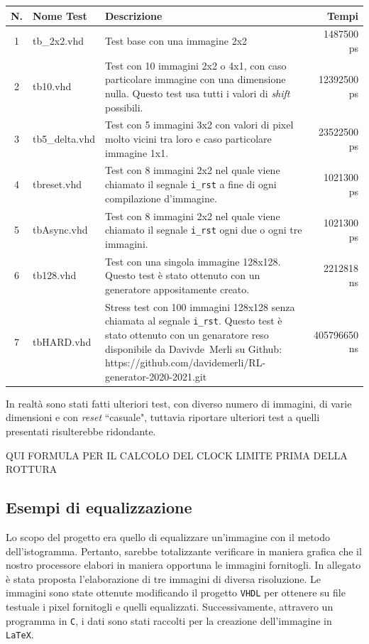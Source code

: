 \documentclass[11pt, a4paper]{article}
\begin{document}
\begin{center}
  \begin{tabular}{|c|l|p{10cm}|r|}
    \hline
    N. &Nome Test & Descrizione & Tempi\\
    \hline
    1 & tb\_2x2.vhd & Test base con una immagine 2x2 & 1487500 ps \\
    \hline
    2 & tb10.vhd & Test con 10 immagini 2x2 o 4x1, con caso particolare immagine con una dimensione nulla. Questo test usa tutti i valori di \textit{shift} possibili.&12392500 ps\\
    \hline
    3 & tb5\_delta.vhd & Test con 5 immagini 3x2 con valori di pixel molto vicini tra loro e caso particolare immagine 1x1. & 23522500 ps\\
    \hline
    4 & tbreset.vhd & Test con 8 immagini 2x2 nel quale viene chiamato il segnale \texttt{i\_rst} a fine di ogni compilazione d'immagine. & 1021300 ps\\
    \hline
    5 & tbAsync.vhd & Test con 8 immagini 2x2 nel quale viene chiamato il segnale \texttt{i\_rst} ogni due o ogni tre immagini. & 1021300 ps\\
    \hline
    6& tb128.vhd & Test con una singola immagine 128x128. Questo test è stato ottenuto con un generatore appositamente creato. & 2212818 ns\\
    \hline
    7 & tbHARD.vhd & Stress test con 100 immagini 128x128 senza chiamata al segnale \texttt{i\_rst}. Questo test è stato ottenuto con un genaratore reso disponibile da \mbox{Davivde Merli} su Github: \mbox{https://github.com/davidemerli/RL-generator-2020-2021.git} & 405796650 ns\\
    \hline
  \end{tabular}
\end{center}

In realtà sono stati fatti ulteriori test, con diverso numero di immagini, di varie dimensioni e con \textit{reset} ``casuale", tuttavia riportare ulteriori test a quelli presentati risulterebbe ridondante.

QUI FORMULA PER IL CALCOLO DEL CLOCK LIMITE PRIMA DELLA ROTTURA
\pagebreak

\subsection{Esempi di equalizzazione}
Lo scopo del progetto era quello di equalizzare un'immagine con il metodo dell'istogramma. Pertanto, sarebbe totalizzante verificare in maniera grafica che il nostro processore elabori in maniera opportuna le immagini fornitogli. In allegato è stata proposta l'elaborazione di tre immagini di diversa risoluzione. Le immagini sono state ottenute modificando il progetto \texttt{VHDL} per ottenere su file testuale i pixel fornitogli e quelli equalizzati. Successivamente, attravero un programma in \texttt{C}, i dati sono stati raccolti per la creazione dell'immagine in \texttt{LaTeX}.\\
\end{document}

